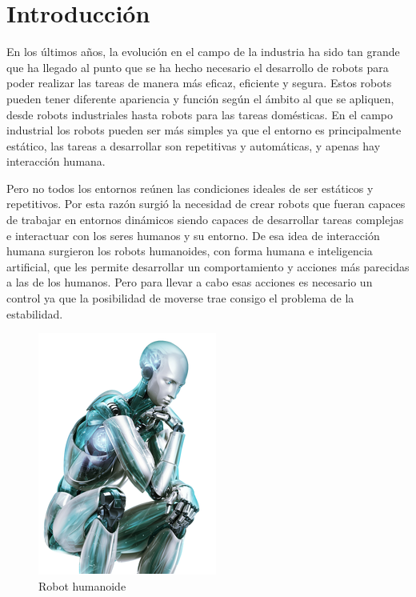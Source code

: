\section{Introducción}

En los últimos años, la evolución en el campo de la industria ha sido tan grande que ha llegado al punto que se ha hecho necesario el desarrollo de robots para poder realizar las tareas de manera más eficaz, eficiente y segura. Estos robots pueden tener diferente apariencia y función según el ámbito al que se apliquen, desde robots industriales hasta robots para las tareas domésticas. En el campo industrial los robots pueden ser más simples ya que el entorno es principalmente estático, las tareas a desarrollar son repetitivas y automáticas, y apenas hay interacción humana. 

Pero no todos los entornos reúnen las condiciones ideales de ser estáticos y repetitivos. Por esta razón surgió la necesidad de crear robots que fueran capaces de trabajar en entornos dinámicos siendo capaces de desarrollar tareas complejas e interactuar con los seres humanos y su entorno. De esa idea de interacción humana surgieron los robots humanoides, con forma humana e inteligencia artificial, que les permite desarrollar un comportamiento y acciones más parecidas a las de los humanos. Pero para llevar a cabo esas acciones es necesario un control ya que la posibilidad de moverse trae consigo el problema de la estabilidad.

\begin{figure}[H]
\centering
\includegraphics[scale=0.7]{imagenes/apartado_1/11_robot_humanoide}
\caption{Robot humanoide}
\label{figura1}
\end{figure}

